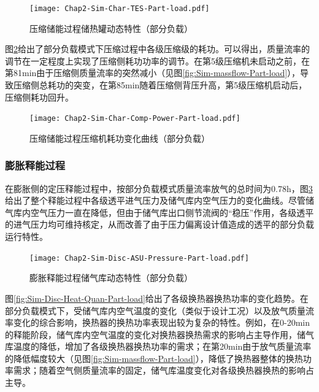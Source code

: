 \begin{figure}[H] %
  \centering
  \texttt{[image: Chap2-Sim-Char-TES-Part-load.pdf]}
  \caption{压缩储能过程储热罐动态特性（部分负载）}
  \label{fig:Sim-Char-TES-Part-load}
\end{figure}

图\ref{fig:Sim-Char-Comp-Power-Part-load}给出了部分负载模式下压缩过程中各级压缩级的耗功。可以得出，质量流率的调节在一定程度上实现了压缩侧耗功功率的调节。在第5级压缩机未启动之前，在第81min由于压缩侧质量流率的突然减小（见图\ref{fig:Sim-massflow-Part-load}），导致压缩侧总耗功的突变，在第85min随着压缩侧背压升高，第5级压缩机启动后，压缩侧耗功回升。

\begin{figure}[H] %
  \centering
  \texttt{[image: Chap2-Sim-Char-Comp-Power-Part-load.pdf]}
  \caption{压缩储能过程压缩机耗功变化曲线（部分负载）}
  \label{fig:Sim-Char-Comp-Power-Part-load}
\end{figure}

\subsubsection{膨胀释能过程}
在膨胀侧的定压释能过程中，按部分负载模式质量流率放气的总时间为0.78h，图\ref{fig:Sim-Disc-ASU-Pressure-Part-load}给出了整个释能过程中各级透平进气压力及储气库内空气压力的变化曲线。尽管储气库内空气压力一直在降低，但由于储气库出口侧节流阀的“稳压”作用，各级透平的进气压力均可维持核定，从而改善了由于压力偏离设计值造成的透平的部分负载运行特性。

\begin{figure}[H] %
  \centering
  \texttt{[image: Chap2-Sim-Disc-ASU-Pressure-Part-load.pdf]}
  \caption{膨胀释能过程储气库动态特性（部分负载）}
  \label{fig:Sim-Disc-ASU-Pressure-Part-load}
\end{figure}

图\ref{fig:Sim-Disc-Heat-Quan-Part-load}给出了各级换热器换热功率的变化趋势。在部分负载模式下，受储气库内空气温度的变化（类似于设计工况）以及放气质量流率变化的综合影响，换热器的换热功率表现出较为复杂的特性。例如，在0-20min的释能阶段，储气库内空气温度的变化对换热器换热需求的影响占主导作用，储气库温度的降低，增加了各级换热器换热功率的需求；在第20min由于放气质量流率的降低幅度较大（见图\ref{fig:Sim-massflow-Part-load}），降低了换热器整体的换热功率需求；随着空气侧质量流率的固定，储气库温度变化对各级换热器换热的影响占主导。

